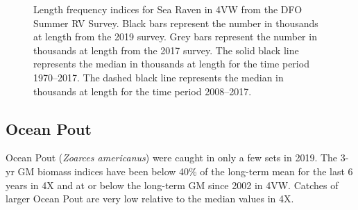 \documentclass[11pt]{book}
\begin{document}
\begin{figure}[htb]

{\centering {} 

}

\caption{Length frequency indices for Sea Raven in 4VW from the DFO Summer RV Survey. Black bars represent the number in thousands at length from the 2019 survey. Grey bars represent the number in thousands at length from the 2017 survey. The solid black line represents the median in thousands at length for the time period 1970--2017. The dashed black line represents the median in thousands at length for the time period 2008--2017.}\label{fig:117-fig-searaven-lengthfreq4VW}
\end{figure}
\clearpage

\hypertarget{ocean-pout}{%
\subsection{Ocean Pout}\label{ocean-pout}}

Ocean Pout (\emph{Zoarces americanus}) were caught in only a few sets in 2019. The 3-yr GM biomass indices have been below 40\% of the long-term mean for the last 6 years in 4X and at or below the long-term GM since 2002 in 4VW. Catches of larger Ocean Pout are very low relative to the median values in 4X.
\end{document}
